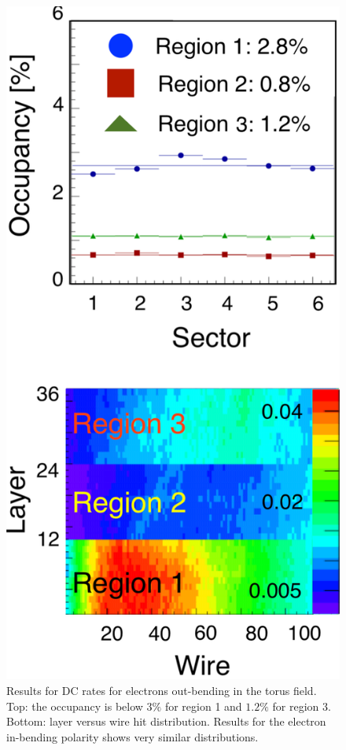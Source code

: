\begin{figure}
	\centering
	\includegraphics[width=0.99\columnwidth,keepaspectratio]{img/dcOccupancy.png}
	\caption{Results for DC rates for electrons out-bending in the torus field.
		     Top: the occupancy is below $3\%$ for region 1 and $1.2\%$ for region 3. Bottom: layer
		     versus wire hit distribution. Results for the electron in-bending polarity shows very similar distributions.}
	\label{fig:dcOccupancy}
\end{figure}


